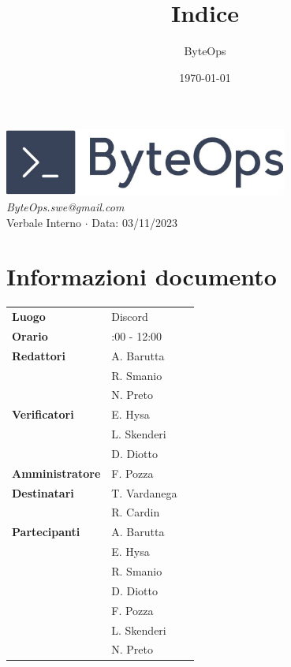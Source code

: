\documentclass{article}
\title{\textbf{\fontsize{30}{6}\selectfont Indice}}
\author{\fontsize{14}{6}\selectfont ByteOps}
\date{\today}
\begin{document}
\pagestyle{fancy}
\begin{center}
\includegraphics[width = 0.7\textwidth]{../../../Images/logo.png} \\
\vspace{0.2cm}
\textcolor[RGB]{60, 60, 60}{\textit{ByteOps.swe@gmail.com}} \\
\vspace{1cm}
\fontsize{16}{6}\selectfont Verbale Interno $\cdot$ Data: 03/11/2023 \\
\vspace{0.5cm}
\end{center}

\section*{Informazioni documento}
\def\arraystretch{1.2}
\begin{tabular}{>{\raggedleft\arraybackslash}p{}|>{\raggedright\arraybackslash}p{}c}
\hline
\addlinespace
    \textbf{Luogo} & Discord \vspace{10pt} \\
    \textbf{Orario} & 10:00 - 12:00 \vspace{10pt} \\
    \textbf{Redattori} & A. Barutta \\ & R. Smanio \\ & N. Preto \vspace{10pt} \\
    \textbf{Verificatori} & E. Hysa \\ & L. Skenderi \\ & D. Diotto \vspace{10pt} \\
    \textbf{Amministratore} & F. Pozza \vspace{10pt} \\
    \textbf{Destinatari} & T. Vardanega \\ & R. Cardin \vspace{10pt} \\
    \textbf{Partecipanti} & A. Barutta \\ & E. Hysa \\ & R. Smanio \\ & D. Diotto \\ & F. Pozza \\ & L. Skenderi \\ & N. Preto \vspace{10pt} \\
\end{tabular}
\pagebreak 
\end{document}
